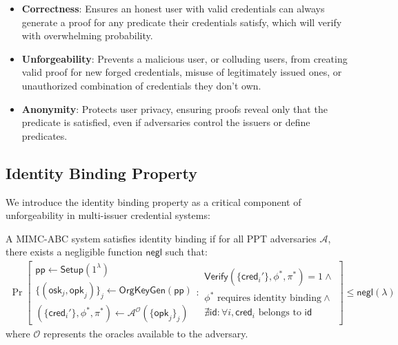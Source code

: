 \begin{itemize}
    \item \textbf{Correctness}: Ensures an honest user with valid credentials can always generate a proof for any predicate their credentials satisfy, which will verify with overwhelming probability.

    \item \textbf{Unforgeability}: Prevents a malicious user, or colluding users, from creating valid proof for new forged credentials, misuse of legitimately issued ones, or unauthorized combination of credentials they don't own.

    \item \textbf{Anonymity}: Protects user privacy, ensuring proofs reveal only that the predicate is satisfied, even if adversaries control the issuers or define predicates.
\end{itemize}

\subsection{Identity Binding Property}
We introduce the identity binding property as a critical component of unforgeability in multi-issuer credential systems:

\begin{definition}
A MIMC-ABC system satisfies identity binding if for all PPT adversaries $\mathcal{A}$, there exists a negligible function $\mathsf{negl}$ such that:
\begin{align*}
\Pr\left[\begin{array}{l}
    \mathsf{pp} \gets \mathsf{Setup}(1^\lambda) \\
    \{(\mathsf{osk}_j, \mathsf{opk}_j)\}_j \gets \mathsf{OrgKeyGen}(\mathsf{pp}) \\
    (\{\mathsf{cred}_i'\}, \phi^*, \pi^*) \gets \mathcal{A}^{\mathcal{O}}(\{\mathsf{opk}_j\}_j)
\end{array}
: \begin{array}{l}
    \mathsf{Verify}(\{\mathsf{cred}_i'\}, \phi^*, \pi^*) = 1 \land \\
    \phi^* \text{ requires identity binding} \land \\
    \nexists \mathsf{id} : \forall i, \mathsf{cred}_i \text{ belongs to } \mathsf{id}
\end{array}\right] \leq \mathsf{negl}(\lambda)
\end{align*}
where $\mathcal{O}$ represents the oracles available to the adversary.
\end{definition}

